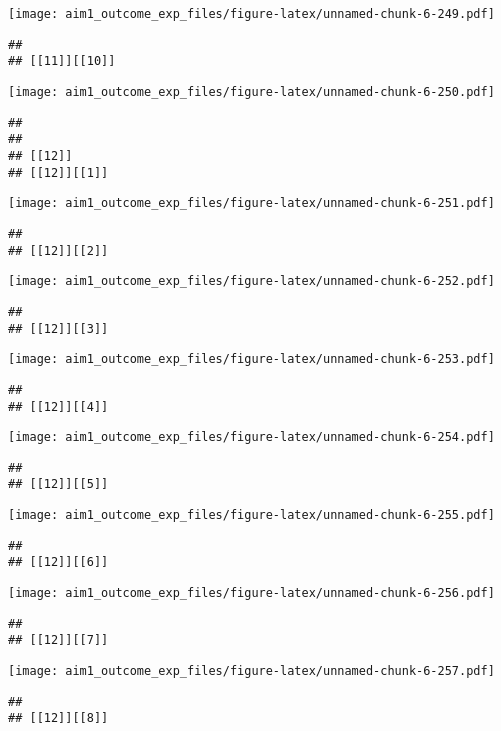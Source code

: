 \documentclass[
]{article}
\begin{document}
\texttt{[image: aim1\_outcome\_exp\_files/figure-latex/unnamed-chunk-6-249.pdf]}

\begin{verbatim}
## 
## [[11]][[10]]
\end{verbatim}

\texttt{[image: aim1\_outcome\_exp\_files/figure-latex/unnamed-chunk-6-250.pdf]}

\begin{verbatim}
## 
## 
## [[12]]
## [[12]][[1]]
\end{verbatim}

\texttt{[image: aim1\_outcome\_exp\_files/figure-latex/unnamed-chunk-6-251.pdf]}

\begin{verbatim}
## 
## [[12]][[2]]
\end{verbatim}

\texttt{[image: aim1\_outcome\_exp\_files/figure-latex/unnamed-chunk-6-252.pdf]}

\begin{verbatim}
## 
## [[12]][[3]]
\end{verbatim}

\texttt{[image: aim1\_outcome\_exp\_files/figure-latex/unnamed-chunk-6-253.pdf]}

\begin{verbatim}
## 
## [[12]][[4]]
\end{verbatim}

\texttt{[image: aim1\_outcome\_exp\_files/figure-latex/unnamed-chunk-6-254.pdf]}

\begin{verbatim}
## 
## [[12]][[5]]
\end{verbatim}

\texttt{[image: aim1\_outcome\_exp\_files/figure-latex/unnamed-chunk-6-255.pdf]}

\begin{verbatim}
## 
## [[12]][[6]]
\end{verbatim}

\texttt{[image: aim1\_outcome\_exp\_files/figure-latex/unnamed-chunk-6-256.pdf]}

\begin{verbatim}
## 
## [[12]][[7]]
\end{verbatim}

\texttt{[image: aim1\_outcome\_exp\_files/figure-latex/unnamed-chunk-6-257.pdf]}

\begin{verbatim}
## 
## [[12]][[8]]
\end{verbatim}
\end{document}
